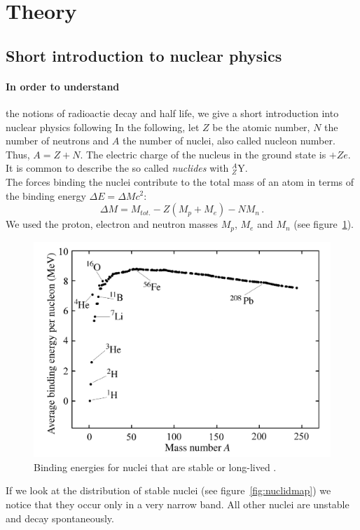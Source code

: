\section{Theory}
\subsection{Short introduction to nuclear physics}
\paragraph{In order to understand}
the notions of radioactie decay and half life, we
give a short introduction into nuclear physics following \cite{martin2006nuclear}
In the following, let $Z$ be the atomic number, $N$ the number of neutrons and $A$ the number of nuclei, also
called nucleon number. Thus, $A = Z + N$. The electric charge of the nucleus in the ground state is $+Z e$.
It is common to describe the so called \emph{nuclides} with $_{Z}^{A}\textrm{Y}$.\\
The forces binding the nuclei contribute to the total mass of an atom in terms of the 
binding energy $\Delta E = \Delta M c^2$:
\begin{equation}
\Delta M = M_{tot.} - Z(M_p + M_e) - N M_n \, .
\end{equation}
We used the proton, electron and neutron masses $M_p$, $M_e$ and $M_n$ 
(see figure~\ref{fig:bindingenergy}).
\begin{figure}[htpb]
    \centering
    \includegraphics[width=0.8\linewidth]{figures/bindingenergy}
    \caption{Binding energies for nuclei that are stable or long-lived \cite{Hooshyar}.}
    \label{fig:bindingenergy}
\end{figure}
If we look at the distribution of stable nuclei (see figure~\ref{fig:nuclidmap}) we notice
that they occur only in a very narrow band. All other nuclei are unstable and decay spontaneously.
